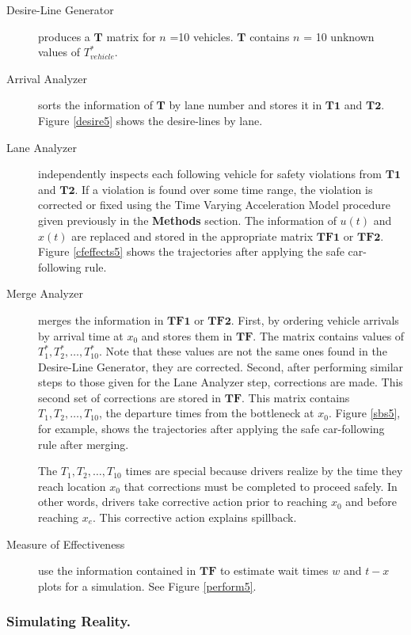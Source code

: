 \documentclass[Proceedings]{ascelike}
\begin{document}
\begin{description}
\item [ Desire-Line Generator] produces a $\mathbf{T}$ matrix for $n$ =10 vehicles. $\mathbf{T}$ contains $n$ = 10     unknown values of $T_{vehicle}^*$.  
\item [ Arrival Analyzer] sorts the information of $\mathbf{T}$ by lane number and stores it in $\mathbf{T1}$ and  $\mathbf{T2}$. Figure \ref{desire5} shows the desire-lines by lane.
\item [ Lane Analyzer] independently inspects each following vehicle for safety violations from $\mathbf{T1}$ and  $\mathbf{T2}$. If a violation is found over some time range, the violation is corrected or fixed using the Time Varying Acceleration Model procedure given previously in the \textbf{Methods} section.  The information of $u(t)$ and $x(t)$  are replaced and stored in   the appropriate matrix $\mathbf{TF1}$ or  $\mathbf{TF2}$. Figure \ref{cfeffects5} shows the trajectories after applying the safe car-following rule.
\item [ Merge Analyzer] merges the information in $\mathbf{TF1}$ or  $\mathbf{TF2}$. First, by ordering vehicle arrivals by arrival time at $x_0$ and stores them in $\mathbf{TF}$. The matrix contains values of  $T^*_1, T^*_2,\ldots,T^*_{10}$. Note that these values are  not the same ones found in the Desire-Line Generator, they are corrected. Second, after performing similar steps to those given for the  Lane Analyzer step, corrections are made. This second set of corrections are stored in $\mathbf{TF}$. This matrix contains $T_1, T_2,\ldots,T_{10}$, the departure times from the bottleneck at $x_0$.  Figure \ref{sbs5}, for example, shows the trajectories after applying the safe car-following rule after merging.

The $T_1, T_2,\ldots,T_{10}$ times are special because drivers realize by the time they reach location $x_0$ that corrections must be completed to proceed safely. In other words, drivers take corrective action prior to reaching $x_0$ and before reaching $x_e$. This corrective action explains spillback.

\item [ Measure of Effectiveness] use the information contained in $\mathbf{TF}$ to estimate wait times $w$ and $t-x$ plots for a simulation. See Figure \ref{perform5}.
\end{description}

\subsubsection{Simulating Reality.} 
\end{document}
